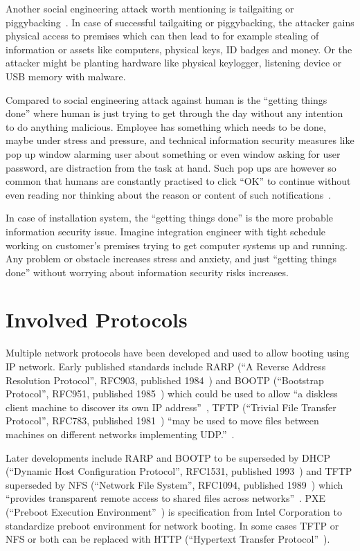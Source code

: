 Another social engineering attack worth mentioning is tailgaiting or
piggybacking~\cite{fairbrother2014insider}. In case of successful
tailgaiting or piggybacking, the attacker gains physical access to
premises which can then lead to for example stealing of information or
assets like computers, physical keys, ID badges and money. Or the
attacker might be planting hardware like physical keylogger, listening
device or USB memory with malware.

Compared to social engineering attack against human is the ``getting
things done'' where human is just trying to get through the day
without any intention to do anything malicious. Employee has something
which needs to be done, maybe under stress and pressure, and technical
information security measures like pop up window alarming user about
something or even window asking for user password, are distraction
from the task at hand. Such pop ups are however so common that humans
are constantly practised to click ``OK'' to continue without even
reading nor thinking about the reason or content of such
notifications~\cite{anderson}.

In case of installation system, the ``getting things done'' is the
more probable information security issue. Imagine integration engineer
with tight schedule working on customer's premises trying to get
computer systems up and running. Any problem or obstacle increases
stress and anxiety, and just ``getting things done'' without worrying
about information security risks increases.


\section{Involved Protocols}

Multiple network protocols have been developed and used to allow
booting using IP network. Early published standards include RARP (``A
Reverse Address Resolution Protocol'', RFC903, published
1984~\cite{RFC903}) and BOOTP (``Bootstrap Protocol'', RFC951,
published 1985~\cite{RFC951}) which could be used to allow ``a
diskless client machine to discover its own IP
address''~\cite{RFC951}, TFTP (``Trivial File Transfer Protocol'',
RFC783, published 1981~\cite{RFC783}) ``may be used to move files
between machines on different networks implementing
UDP.''~\cite{RFC783}.

Later developments include RARP and BOOTP to be superseded by DHCP
(``Dynamic Host Configuration Protocol'', RFC1531, published
1993~\cite{RFC1531}) and TFTP superseded by NFS (``Network File
System'', RFC1094, published 1989~\cite{RFC1094}) which ``provides
transparent remote access to shared files across
networks''~\cite{RFC1094}. PXE (``Preboot Execution
Environment''~\cite{PXEspec}) is specification from Intel Corporation
to standardize preboot environment for network booting. In some cases
TFTP or NFS or both can be replaced with HTTP (``Hypertext Transfer
Protocol''~\cite{RFC1945}\cite{RFC2616}).


